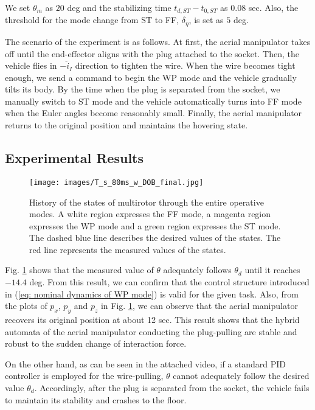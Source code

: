 \documentclass[letterpaper, 10 pt, conference]{ieeeconf}  %
\theoremstyle{definition}
\begin{document}
We set $\theta_m$ as $20$ deg and the stabilizing time $t_{d, ST} - t_{0, ST}$ as $0.08$ sec. Also, the threshold for the mode change from ST to FF, $\delta_{\eta}$, is set as $5$ deg.

The scenario of the experiment is as follows. At first, the aerial manipulator takes off until the end-effector aligns with the plug attached to the socket. Then, the vehicle flies in $-\hat{i}_I$ direction to tighten the wire. When the wire becomes tight enough, we send a command to begin the WP mode and the vehicle gradually tilts its body. By the time when the plug is separated from the socket, we manually switch to ST mode and the vehicle automatically turns into FF mode when the Euler angles become reasonably small. Finally, the aerial manipulator returns to the original position and maintains the hovering state.

\subsection{Experimental Results}
\begin{figure}[t]
\centering
\texttt{[image: images/T\_s\_80ms\_w\_DOB\_final.jpg]}
\caption{History of the states of multirotor through the entire operative modes. A white region expresses the FF mode, a magenta region expresses the WP mode and a green region expresses the ST mode. The dashed blue line describes the desired values of the states. The red line represents the measured values of the states.} \label{fig: T_s_80ms_w_DOB_final}
\vspace{-0.6cm}
\end{figure}
Fig. \ref{fig: T_s_80ms_w_DOB_final} shows that the measured value of $\theta$ adequately follows $\theta_d$ until it reaches $-14.4$ deg. From this result, we can confirm that the control structure introduced in (\ref{eq: nominal dynamics of WP mode}) is valid for the given task. Also, from the plots of $p_x$, $p_y$ and $p_z$ in Fig. \ref{fig: T_s_80ms_w_DOB_final}, we can observe that the aerial manipulator recovers its original position at about 12 sec. This result shows that the hybrid automata of the aerial manipulator conducting the plug-pulling are stable and robust to the sudden change of interaction force. 

On the other hand, as can be seen in the attached video, if a standard PID controller is employed for the wire-pulling, $\theta$ cannot adequately follow the desired value $\theta_d$. Accordingly, after the plug is separated from the socket, the vehicle fails to maintain its stability and crashes to the floor.
\end{document}
